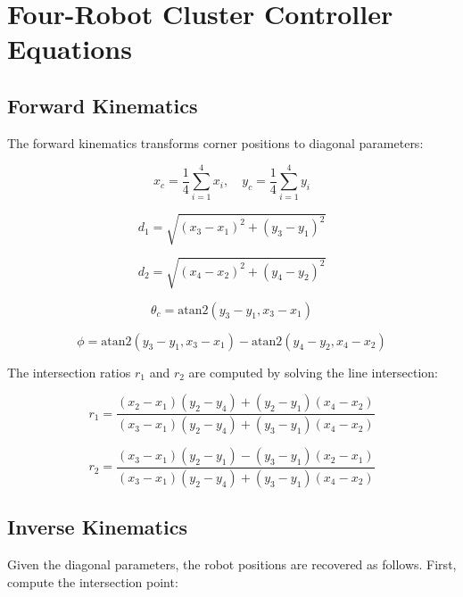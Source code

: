 \documentclass[lettersize,journal]{IEEEtran}
\begin{document}
\section{Four-Robot Cluster Controller Equations}

\subsection{Forward Kinematics}

The forward kinematics transforms corner positions to diagonal parameters:

\begin{equation}
x_c = \frac{1}{4}\sum_{i=1}^{4} x_i, \quad y_c = \frac{1}{4}\sum_{i=1}^{4} y_i
\end{equation}

\begin{equation}
d_1 = \sqrt{(x_3 - x_1)^2 + (y_3 - y_1)^2}
\end{equation}

\begin{equation}
d_2 = \sqrt{(x_4 - x_2)^2 + (y_4 - y_2)^2}
\end{equation}

\begin{equation}
\theta_c = \text{atan2}(y_3 - y_1, x_3 - x_1)
\end{equation}

\begin{equation}
\phi = \text{atan2}(y_3 - y_1, x_3 - x_1) - \text{atan2}(y_4 - y_2, x_4 - x_2)
\end{equation}

The intersection ratios $r_1$ and $r_2$ are computed by solving the line intersection:

\begin{equation}
r_1 = \frac{(x_2 - x_1)(y_2 - y_4) + (y_2 - y_1)(x_4 - x_2)}{(x_3 - x_1)(y_2 - y_4) + (y_3 - y_1)(x_4 - x_2)}
\end{equation}

\begin{equation}
r_2 = \frac{(x_3 - x_1)(y_2 - y_1) - (y_3 - y_1)(x_2 - x_1)}{(x_3 - x_1)(y_2 - y_4) + (y_3 - y_1)(x_4 - x_2)}
\end{equation}

\subsection{Inverse Kinematics}

Given the diagonal parameters, the robot positions are recovered as follows. First, compute the intersection point:
\end{document}
